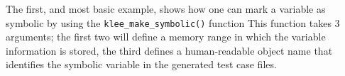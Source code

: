 The first, and most basic example, shows how one can mark a variable as symbolic by using the \lstinline$klee_make_symbolic()$ function 
This function takes 3 arguments; the first two will define a memory range in which the variable information is stored, the third defines a human-readable object name that identifies the symbolic variable in the generated test case files. %



% 

% 


